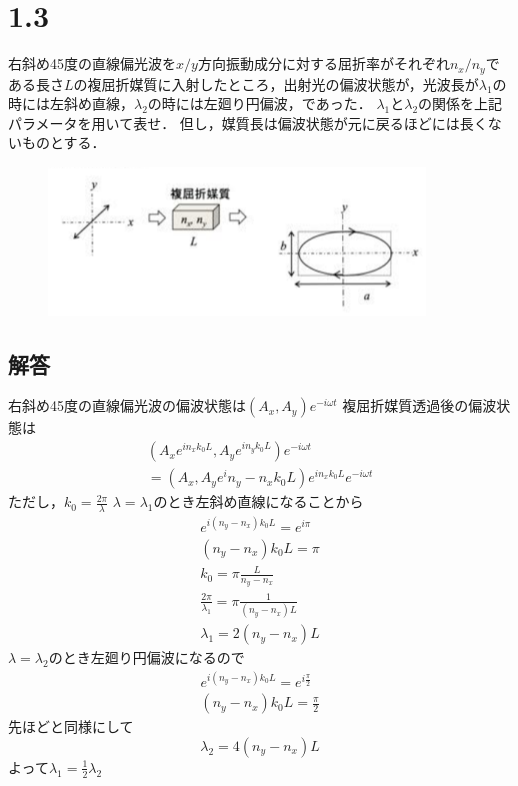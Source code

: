 \section*{1.3}
右斜め45度の直線偏光波を$x/y$方向振動成分に対する屈折率がそれぞれ$n_x/n_y$である長さ$L$の複屈折媒質に入射したところ，出射光の偏波状態が，光波長が$\lambda_1$の時には左斜め直線，$\lambda_2$の時には左廻り円偏波，であった．
$\lambda_1$と$\lambda_2$の関係を上記パラメータを用いて表せ．
但し，媒質長は偏波状態が元に戻るほどには長くないものとする．

\begin{figure}[H]
    \begin{center}
        \includegraphics[width=100mm]{./figures/section/figure_2.eps}
    \end{center}
\end{figure}

\subsection*{解答}
\noindent
右斜め45度の直線偏光波の偏波状態は$(A_x, A_y)e^{-i\omega t}$
複屈折媒質透過後の偏波状態は
\begin{eqnarray*}
  (A_xe^{in_xk_0L}, A_ye^{in_yk_0L})e^{-i\omega t}\\
  =(A_x, A_ye^i{n_y-n_x}k_0L)e^{in_xk_0L}e^{-i\omega t}
\end{eqnarray*}
ただし，$k_0=\frac{2\pi}{\lambda}$
$\lambda=\lambda_1$のとき左斜め直線になることから
\begin{eqnarray*}
  e^{i(n_y-n_x)k_0L}=e^{i\pi}\\
  (n_y-n_x)k_0L=\pi\\
  k_0=\pi\frac{L}{n_y-n_x}\\
  \frac{2\pi}{\lambda_1}=\pi\frac{1}{(n_y-n_x)L}\\
  \lambda_1=2(n_y-n_x)L
\end{eqnarray*}
$\lambda=\lambda_2$のとき左廻り円偏波になるので
\begin{eqnarray*}
  e^{i(n_y-n_x)k_0L}=e^{i\frac{\pi}{2}}\\
  (n_y-n_x)k_0L=\frac{\pi}{2}
\end{eqnarray*}
先ほどと同様にして
\begin{displaymath}
  \lambda_2=4(n_y-n_x)L
\end{displaymath}
よって$\lambda_1=\frac{1}{2}\lambda_2$